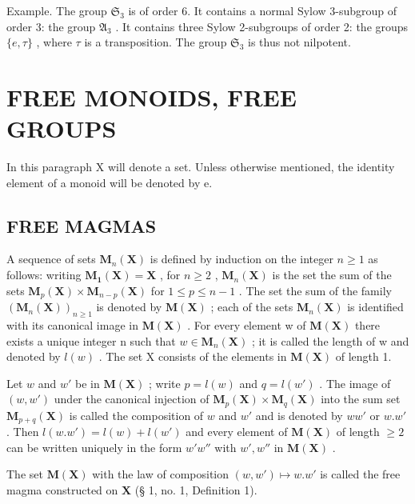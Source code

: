 Example. The group \(\mathfrak{S}_3\) is of order 6. It contains a normal Sylow 3-subgroup of order 3: the group \(\mathfrak{A}_3\) . It contains three Sylow 2-subgroups of order 2: the groups \(\{e, \tau\}\) , where \(\tau\) is a transposition. The group \(\mathfrak{S}_3\) is thus not nilpotent.

\section{FREE MONOIDS, FREE GROUPS}

In this paragraph X will denote a set. Unless otherwise mentioned, the identity element of a monoid will be denoted by e.

\subsection{FREE MAGMAS}

A sequence of sets \(\mathbf{M}_{n}(\mathbf{X})\) is defined by induction on the integer \(n \geqslant 1\) as follows: writing \(\mathbf{M}_{\mathbf{1}}(\mathbf{X}) = \mathbf{X}\) , for \(n \geqslant 2\) , \(\mathbf{M}_{n}(\mathbf{X})\) is the set the sum of the sets \(\mathbf{M}_{p}(\mathbf{X}) \times \mathbf{M}_{n-p}(\mathbf{X})\) for \(1 \leqslant p \leqslant n - 1\) . The set the sum of the family \((\mathbf{M}_{n}(\mathbf{X}))_{n \geqslant 1}\) is denoted by \(\mathbf{M}(\mathbf{X})\) ; each of the sets \(\mathbf{M}_{n}(\mathbf{X})\) is identified with its canonical image in \(\mathbf{M}(\mathbf{X})\) . For every element w of \(\mathbf{M}(\mathbf{X})\) there exists a unique integer n such that \(w \in \mathbf{M}_{n}(\mathbf{X})\) ; it is called the length of w and denoted by \(l(w)\) . The set X consists of the elements in \(\mathbf{M}(\mathbf{X})\) of length 1.

Let \(w\) and \(w'\) be in \(\mathbf{M}(\mathbf{X})\) ; write \(p = l(w)\) and \(q = l(w')\) . The image of \((w, w')\) under the canonical injection of \(\mathbf{M}_p(\mathbf{X}) \times \mathbf{M}_q(\mathbf{X})\) into the sum set \(\mathbf{M}_{p + q}(\mathbf{X})\) is called the composition of \(w\) and \(w'\) and is denoted by \(ww'\) or \(w.w'\) . Then \(l(w.w') = l(w) + l(w')\) and every element of \(\mathbf{M}(\mathbf{X})\) of length \(\geqslant 2\) can be written uniquely in the form \(w'w''\) with \(w', w''\) in \(\mathbf{M}(\mathbf{X})\) .

The set \(\mathbf{M}(\mathbf{X})\) with the law of composition \((w, w') \mapsto w.w'\) is called the free magma constructed on \(\mathbf{X}\) (§ 1, no. 1, Definition 1).


